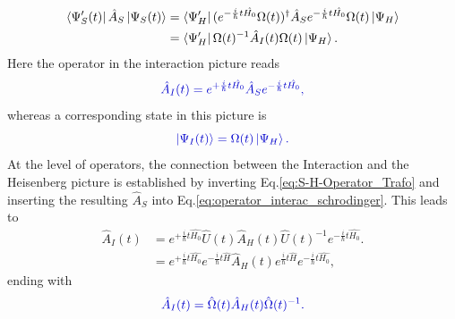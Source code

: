 \documentclass[12pt, titlepage]{article}
\begin{document}
\begin{subequations}
\textcolor[RGB]{0,0,0}{
\begin{align}\label{eq:matrix_ele_for_interaction}
	\bra{\Psi_{S}^{\prime}(t)}
	\hat{A}_{S}
	\ket{\Psi_{S}(t)}
  		&= 	\bra{\Psi_{H}^{\prime}}
			(e^{-\frac{i}{\hbar}t \hat{H_{0}}}	
			\Omega (t))^{\dagger}
			\hat{A}_{S}
			e^{-\frac{i}{\hbar}t \hat{H_{0}}}
			\Omega (t)
			\ket{\Psi_{H}}
  		\\
  		&= \bra{\Psi^{\prime}_{H}}
  			\Omega(t)^{-1}
			\hat{A}_{I}(t)
			\Omega (t)
			\ket{\Psi_{H}}
			.
\end{align}
}
\end{subequations}
Here the operator in the interaction picture reads
\begin{equation}\label{eq:operator_interac_schrodinger}
\textcolor[RGB]{0,0,204}{
	\hat{A}_{I}(t)
	=
	e^{+\frac{i}{\hbar}t \hat{H_{0}}}
	\hat{A}_{S}
	e^{-\frac{i}{\hbar}t \hat{H_{0}}}	
,
}
\end{equation}
whereas a corresponding state in this picture is
\begin{equation}\label{eq:state_interac_schrodinger}
\textcolor[RGB]{0,0,204}{
	\ket{\Psi_{I}(t)}
	=\Omega (t)
			\ket{\Psi_{H}}
		.
}
\end{equation}
At the level of operators, the connection between the Interaction and the Heisenberg picture is established by inverting Eq.\enskip\eqref{eq:S-H-Operator_Trafo} and inserting the resulting $ 	\hat{A}_{S}
 $ into Eq.\enskip\eqref{eq:operator_interac_schrodinger}. This leads to
\begin{subequations}
\begin{align}
	\hat{A}_{I}(t)
	&=
	e^{+\frac{i}{\hbar}t \hat{H_{0}}}
	\hat{U}(t)	
	\hat{A}_{H}(t)
	\hat{U}(t)^{-1}	
	e^{-\frac{i}{\hbar}t \hat{H_{0}}}	.
	\\
	&=
	e^{+\frac{i}{\hbar}t \hat{H_{0}}}
	e^{-\frac{i}{\hbar}t\hat{H}}
	\hat{A}_{H}(t)
	e^{\frac{i}{\hbar}t\hat{H}}	
	e^{-\frac{i}{\hbar}t \hat{H_{0}}}	
	,
\end{align}
\end{subequations}
ending with
\begin{equation}\label{eq:operator_interac_heisenberg}
\textcolor[RGB]{0,0,204}{
	\hat{A}_{I}(t)
	=
	\hat{\Omega}(t)
	\hat{A}_{H}(t)
	\hat{\Omega}(t)^{-1}
	.
}
\end{equation}
\end{document}
